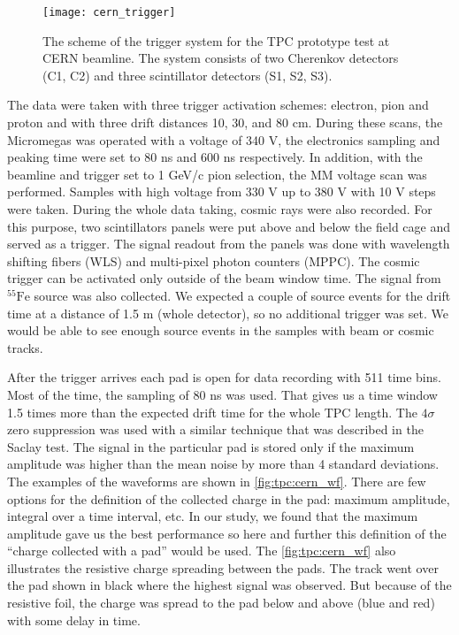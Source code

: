\documentclass[../main.tex]{subfiles}
\begin{document}
\begin{figure}[!ht]
   \centering
   \texttt{[image: cern\_trigger]}
   \caption{The scheme of the trigger system for the TPC prototype test at CERN beamline. The system consists of two Cherenkov detectors (C1, C2) and three scintillator detectors (S1, S2, S3).}
   \label{fig:cern:trigger}
 \end{figure}

The data were taken with three trigger activation schemes: electron, pion and proton and with three drift distances 10, 30, and 80 cm. During these scans, the Micromegas was operated with a voltage of 340 V, the electronics sampling and peaking time were set to 80 ns and 600 ns respectively. In addition, with the beamline and trigger set to 1 GeV/c pion selection, the MM voltage scan was performed. Samples with high voltage from 330 V up to 380 V with 10 V steps were taken. During the whole data taking, cosmic rays were also recorded. For this purpose, two scintillators panels were put above and below the field cage and served as a trigger. The signal readout from the panels was done with wavelength shifting fibers (WLS) and multi-pixel photon counters (MPPC). The cosmic trigger can be activated only outside of the beam window time. The signal from ${}^{55}\text{Fe}$ source was also collected. We expected a couple of source events for the drift time at a distance of 1.5 m (whole detector), so no additional trigger was set. We would be able to see enough source events in the samples with beam or cosmic tracks.

After the trigger arrives each pad is open for data recording with 511 time bins. Most of the time, the sampling of 80 ns was used. That gives us a time window 1.5 times more than the expected drift time for the whole TPC length. The $4\sigma$ zero suppression was used with a similar technique that was described in the Saclay test. The signal in the particular pad is stored only if the maximum amplitude was higher than the mean noise by more than 4 standard deviations. The examples of the waveforms are shown in \autoref{fig:tpc:cern_wf}. There are few options for the definition of the collected charge in the pad: maximum amplitude, integral over a time interval, etc. In our study, we found that the maximum amplitude gave us the best performance so here and further this definition of the ``charge collected with a pad'' would be used. The \autoref{fig:tpc:cern_wf} also illustrates the resistive charge spreading between the pads. The track went over the pad shown in black where the highest signal was observed. But because of the resistive foil, the charge was spread to the pad below and above (blue and red) with some delay in time.
\end{document}
